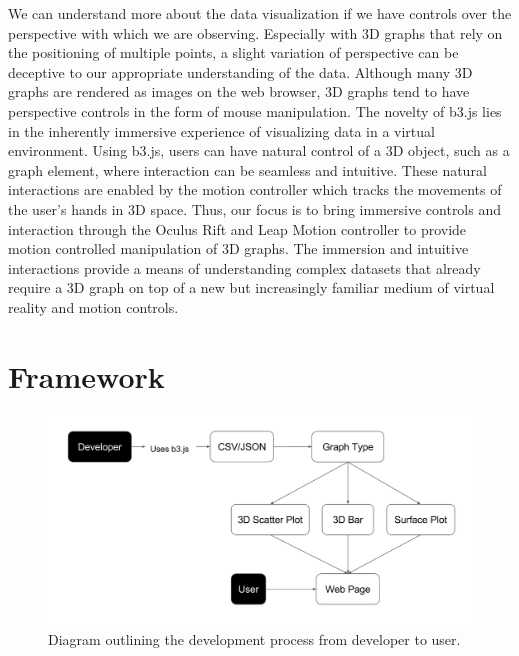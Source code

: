 \documentclass{vgtc}                          %
\begin{document}
We can understand more about the data visualization if we have controls over the perspective with which we are observing. Especially with 3D graphs that rely on the positioning of multiple points, a slight variation of perspective can be deceptive to our appropriate understanding of the data. Although many 3D graphs are rendered as images on the web browser, 3D graphs tend to have perspective controls in the form of mouse manipulation. The novelty of b3.js lies in the inherently immersive experience of visualizing data in a virtual environment. Using b3.js, users can have natural control of a 3D object, such as a graph element, where interaction can be seamless and intuitive. These natural interactions are enabled by the motion controller which tracks the movements of the user’s hands in 3D space. Thus, our focus is to bring immersive controls and interaction through the Oculus Rift and Leap Motion controller to provide motion controlled manipulation of 3D graphs. The immersion and intuitive interactions provide a means of understanding complex datasets that already require a 3D graph on top of a new but increasingly familiar medium of virtual reality and motion controls.

\section{Framework}

\begin{figure}[t]
\begin{center}
   \includegraphics[width=0.75\linewidth]{figure2}
\end{center}
   \caption{Diagram outlining the development process from developer to user.}
\end{figure}
\end{document}
